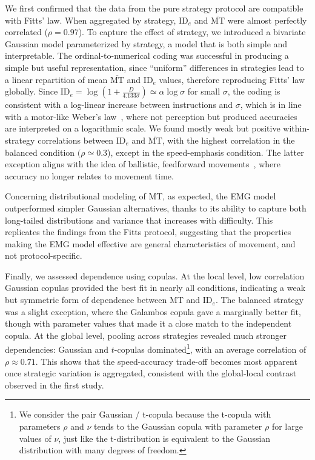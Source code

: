 \documentclass[acmlarge, manuscript,review]{acmart}
\newcommand{\mmt}{\ensuremath{\overline{\mt}}\xspace}
\newcommand{\mt}{\ensuremath{{\text{MT}}}\xspace}
\newcommand{\ide}{\ensuremath{{\text{ID}_e}}\xspace}
\begin{document}
We first confirmed that the data from the pure strategy protocol are compatible with Fitts' law. When aggregated by strategy, \ide and \mmt were almost perfectly correlated ($\rho = 0.97$). To capture the effect of strategy, we introduced a bivariate Gaussian model parameterized by strategy, a model that is both simple and interpretable.  The ordinal-to-numerical coding was successful in producing a simple but useful representation, since ``uniform'' differences in strategies lead to a linear repartition of mean \mmt and \ide values, therefore reproducing Fitts' law globally. Since $\ide = \log(1 + \tfrac{D}{4.133\sigma}) \simeq \alpha \log \sigma$ for small $\sigma$, the coding is consistent with a log-linear increase between instructions and $\sigma$, which is in line with a motor-like Weber's law~\cite{kandel}, where not perception but produced accuracies are interpreted on a logarithmic scale.
We found mostly weak but positive within-strategy correlations between \ide and \mmt, with the highest correlation in the balanced condition $(\rho \simeq 0.3$), except in the speed-emphasis condition. The latter exception aligns with the idea of ballistic, feedforward movements~\cite{gan1988,crossman1957}, where accuracy no longer relates to movement time.

Concerning distributional modeling of MT, as expected, the EMG model outperformed simpler Gaussian alternatives, thanks to its ability to capture both long-tailed distributions and variance that increases with difficulty. This replicates the findings from the Fitts protocol, suggesting that the properties making the EMG model effective are general characteristics of movement, and not protocol-specific.

Finally, we assessed dependence using copulas. At the local level, low correlation Gaussian copulas provided the best fit in nearly all conditions, indicating a weak but symmetric form of dependence between MT and \ide. The balanced strategy was a slight exception, where the Galambos copula gave a marginally better fit, though with parameter values that made it a close match to the independent copula. At the global level, pooling across strategies revealed much stronger dependencies: Gaussian and $t$-copulas dominated\footnote{We consider the pair Gaussian / t-copula because the t-copula with parameters $\rho$ and $\nu$ tends to the Gaussian copula with parameter $\rho$ for large values of $\nu$, just like the t-distribution is equivalent to the Gaussian distribution with many degrees of freedom. %
}, with an average correlation of $\rho \approx 0.71$. This shows that the speed-accuracy trade-off becomes most apparent once strategic variation is aggregated, consistent with the global-local contrast observed in the first study.
\end{document}
